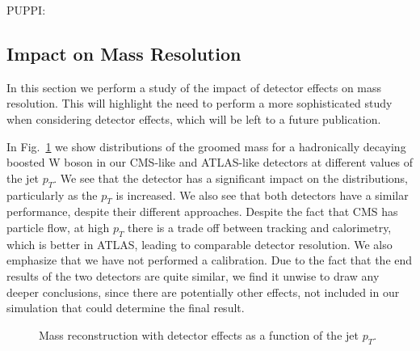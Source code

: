 \documentclass[11pt,letterpaper]{article}
\DeclareRobustCommand{\Fig}[1]{Fig.~\ref{#1}}
\begin{document}
PUPPI: \cite{Bertolini:2014bba}

\subsection{Impact on Mass Resolution}\label{sec:detector_robust}

In this section we perform a study of the impact of detector effects on mass resolution. This will highlight the need to perform a more sophisticated study when considering detector effects, which will be left to a future publication.

In \Fig{fig:mass-detector} we show distributions of the groomed mass for a hadronically decaying boosted W boson in our CMS-like and ATLAS-like detectors at different values of the jet $p_T$. We see that the detector has a significant impact on the distributions, particularly as the $p_T$ is increased. We also see that both detectors have a similar performance, despite their different approaches. Despite the fact that CMS has particle flow, at high $p_T$ there is a trade off between tracking and calorimetry, which is better in ATLAS, leading to comparable detector resolution. We also emphasize that we have not performed a calibration. Due to the fact that the end results of the two detectors are quite similar, we find it unwise to draw any deeper conclusions, since there are potentially other effects, not included in our simulation that could determine the final result.



\begin{figure}
  \caption{Mass reconstruction with detector effects as a function of the jet $p_T$.}
  \label{fig:mass-detector}
\end{figure}
\end{document}
